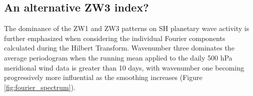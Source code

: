 \subsection{An alternative ZW3 index?}

The dominance of the ZW1 and ZW3 patterns on SH planetary wave activity is further emphasized when considering the individual Fourier components calculated during the Hilbert Transform. Wavenumber three dominates the average periodogram when the running mean applied to the daily 500 hPa meridional wind data is greater than 10 days, with wavenumber one becoming progressively more influential as the smoothing increases (Figure \ref{fig:fourier_spectrum}).